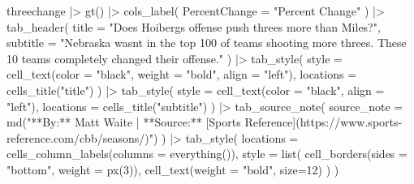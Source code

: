 \documentclass[
  letterpaper,
  DIV=11,
  numbers=noendperiod]{scrreprt}
\newenvironment{Shaded}{\begin{snugshade}}{\end{snugshade}}
\newcommand{\AttributeTok}[1]{\textcolor[rgb]{0.40,0.45,0.13}{#1}}
\newcommand{\DecValTok}[1]{\textcolor[rgb]{0.68,0.00,0.00}{#1}}
\newcommand{\FunctionTok}[1]{\textcolor[rgb]{0.28,0.35,0.67}{#1}}
\newcommand{\NormalTok}[1]{\textcolor[rgb]{0.00,0.23,0.31}{#1}}
\newcommand{\SpecialCharTok}[1]{\textcolor[rgb]{0.37,0.37,0.37}{#1}}
\newcommand{\StringTok}[1]{\textcolor[rgb]{0.13,0.47,0.30}{#1}}
\begin{document}
\begin{Shaded}
\begin{Highlighting}[]
\NormalTok{threechange }\SpecialCharTok{|\textgreater{}} 
  \FunctionTok{gt}\NormalTok{() }\SpecialCharTok{|\textgreater{}} 
  \FunctionTok{cols\_label}\NormalTok{(}
    \AttributeTok{PercentChange =} \StringTok{"Percent Change"}
\NormalTok{  ) }\SpecialCharTok{|\textgreater{}}
  \FunctionTok{tab\_header}\NormalTok{(}
    \AttributeTok{title =} \StringTok{"Does Hoiberg\textquotesingle{}s offense push threes more than Miles?"}\NormalTok{,}
    \AttributeTok{subtitle =} \StringTok{"Nebraska wasn\textquotesingle{}t in the top 100 of teams shooting more threes. These 10 teams completely changed their offense."}
\NormalTok{  ) }\SpecialCharTok{|\textgreater{}} 
  \FunctionTok{tab\_style}\NormalTok{(}
    \AttributeTok{style =} \FunctionTok{cell\_text}\NormalTok{(}\AttributeTok{color =} \StringTok{"black"}\NormalTok{, }\AttributeTok{weight =} \StringTok{"bold"}\NormalTok{, }\AttributeTok{align =} \StringTok{"left"}\NormalTok{),}
    \AttributeTok{locations =} \FunctionTok{cells\_title}\NormalTok{(}\StringTok{"title"}\NormalTok{)}
\NormalTok{  ) }\SpecialCharTok{|\textgreater{}} 
  \FunctionTok{tab\_style}\NormalTok{(}
    \AttributeTok{style =} \FunctionTok{cell\_text}\NormalTok{(}\AttributeTok{color =} \StringTok{"black"}\NormalTok{, }\AttributeTok{align =} \StringTok{"left"}\NormalTok{),}
    \AttributeTok{locations =} \FunctionTok{cells\_title}\NormalTok{(}\StringTok{"subtitle"}\NormalTok{)}
\NormalTok{  ) }\SpecialCharTok{|\textgreater{}}  
  \FunctionTok{tab\_source\_note}\NormalTok{(}
    \AttributeTok{source\_note =} \FunctionTok{md}\NormalTok{(}\StringTok{"**By:** Matt Waite  |  **Source:** [Sports Reference](https://www.sports{-}reference.com/cbb/seasons/)"}\NormalTok{)}
\NormalTok{  ) }\SpecialCharTok{|\textgreater{}}
  \FunctionTok{tab\_style}\NormalTok{(}
     \AttributeTok{locations =} \FunctionTok{cells\_column\_labels}\NormalTok{(}\AttributeTok{columns =} \FunctionTok{everything}\NormalTok{()),}
     \AttributeTok{style =} \FunctionTok{list}\NormalTok{(}
       \FunctionTok{cell\_borders}\NormalTok{(}\AttributeTok{sides =} \StringTok{"bottom"}\NormalTok{, }\AttributeTok{weight =} \FunctionTok{px}\NormalTok{(}\DecValTok{3}\NormalTok{)),}
       \FunctionTok{cell\_text}\NormalTok{(}\AttributeTok{weight =} \StringTok{"bold"}\NormalTok{, }\AttributeTok{size=}\DecValTok{12}\NormalTok{)}
\NormalTok{     )}
\NormalTok{   ) }
\end{Highlighting}
\end{Shaded}
\end{document}
